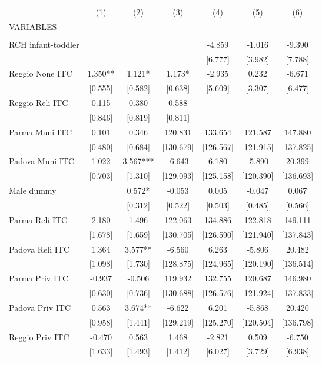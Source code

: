 \begin{tabular}{lcccccc} \hline
 & (1) & (2) & (3) & (4) & (5) & (6) \\
VARIABLES &  &  &  &  &  &  \\ \hline
 &  &  &  &  &  &  \\
RCH infant-toddler &  &  &  & -4.859 & -1.016 & -9.390 \\
 &  &  &  & [6.777] & [3.982] & [7.788] \\
Reggio None ITC & 1.350** & 1.121* & 1.173* & -2.935 & 0.232 & -6.671 \\
 & [0.555] & [0.582] & [0.638] & [5.609] & [3.307] & [6.477] \\
Reggio Reli ITC & 0.115 & 0.380 & 0.588 &  &  &  \\
 & [0.846] & [0.819] & [0.811] &  &  &  \\
Parma Muni ITC & 0.101 & 0.346 & 120.831 & 133.654 & 121.587 & 147.880 \\
 & [0.480] & [0.684] & [130.679] & [126.567] & [121.915] & [137.825] \\
Padova Muni ITC & 1.022 & 3.567*** & -6.643 & 6.180 & -5.890 & 20.399 \\
 & [0.703] & [1.310] & [129.093] & [125.158] & [120.390] & [136.693] \\
Male dummy &  & 0.572* & -0.053 & 0.005 & -0.047 & 0.067 \\
 &  & [0.312] & [0.522] & [0.503] & [0.485] & [0.566] \\
Parma Reli ITC & 2.180 & 1.496 & 122.063 & 134.886 & 122.818 & 149.111 \\
 & [1.678] & [1.659] & [130.705] & [126.590] & [121.940] & [137.843] \\
Padova Reli ITC & 1.364 & 3.577** & -6.560 & 6.263 & -5.806 & 20.482 \\
 & [1.098] & [1.730] & [128.875] & [124.965] & [120.190] & [136.514] \\
Parma Priv ITC & -0.937 & -0.506 & 119.932 & 132.755 & 120.687 & 146.980 \\
 & [0.630] & [0.736] & [130.688] & [126.576] & [121.924] & [137.833] \\
Padova Priv ITC & 0.563 & 3.674** & -6.622 & 6.201 & -5.868 & 20.420 \\
 & [0.958] & [1.441] & [129.219] & [125.270] & [120.504] & [136.798] \\
Reggio Priv ITC & -0.470 & 0.563 & 1.468 & -2.821 & 0.509 & -6.750 \\
 & [1.633] & [1.493] & [1.412] & [6.027] & [3.729] & [6.938] \\

\end{tabular}
